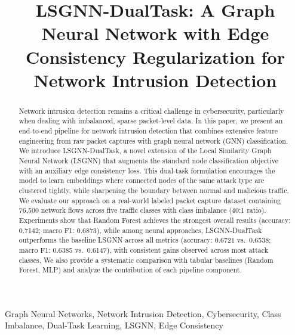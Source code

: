 \documentclass[conference]{IEEEtran}
\begin{document}
\title{LSGNN-DualTask: A Graph Neural Network with Edge Consistency Regularization for Network Intrusion Detection}

\author{
}

\maketitle

\begin{abstract}
Network intrusion detection remains a critical challenge in cybersecurity, particularly when dealing with imbalanced, sparse packet-level data. In this paper, we present an end-to-end pipeline for network intrusion detection that combines extensive feature engineering from raw packet captures with graph neural network (GNN) classification. We introduce LSGNN-DualTask, a novel extension of the Local Similarity Graph Neural Network (LSGNN) that augments the standard node classification objective with an auxiliary edge consistency loss. This dual-task formulation encourages the model to learn embeddings where connected nodes of the same attack type are clustered tightly, while sharpening the boundary between normal and malicious traffic. We evaluate our approach on a real-world labeled packet capture dataset containing 76{,}500 network flows across five traffic classes with class imbalance (40:1 ratio). Experiments show that Random Forest achieves the strongest overall results (accuracy: 0.7142; macro F1: 0.6873), while among neural approaches, LSGNN-DualTask outperforms the baseline LSGNN across all metrics (accuracy: 0.6721 vs.\ 0.6538; macro F1: 0.6385 vs.\ 0.6147), with consistent gains observed across most attack classes. We also provide a systematic comparison with tabular baselines (Random Forest, MLP) and analyze the contribution of each pipeline component.
\end{abstract}

\begin{IEEEkeywords}
Graph Neural Networks, Network Intrusion Detection, Cybersecurity, Class Imbalance, Dual-Task Learning, LSGNN, Edge Consistency
\end{IEEEkeywords}
\end{document}
